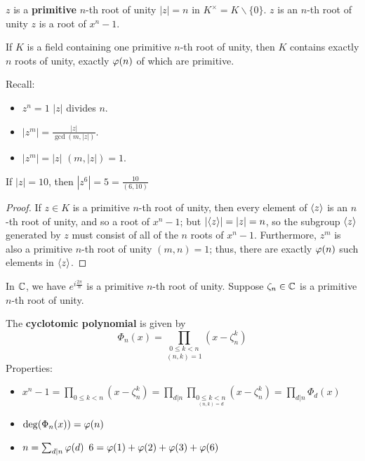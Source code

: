 \documentclass[12pt]{article}
\begin{document}
\rmk $z$ is a \textbf{primitive} $n$-th root of unity \ifnif $|z|=n$ in $K^{\times}=K\backslash \{0\}$.
\rmk $z$ is an $n$-th root of unity \ifnif $z$ is a root of $x^n-1$.

\begin{lemma}
    If $K$ is a field containing one primitive $n$-th root of unity, then $K$ contains exactly $n$ roots of unity, exactly $\varphi (n)$ of which are primitive.
\end{lemma}

\rmk Recall:
\begin{itemize}
    \item $z^n=1$ \ifnif $|z|$ divides $n$.
    \item $|z^m|=\frac{|z|}{\gcd(m,|z|)}$.
    \item $|z^m|=|z|$ \ifnif $(m,|z|)=1$.
\end{itemize}
\eg If $|z|=10$, then $|z^6|=5=\frac{10}{(6,10)}$
\begin{proof}
    If $z\in K$ is a primitive $n$-th root of unity, then every element of $\langle z \rangle$ is an $n$-th root of unity, and so a root of $x^n-1$; but $|\langle z \rangle|=|z|=n$, so the subgroup $\langle z \rangle$ generated by $z$  must consist of all of the $n$ roots of $x^n-1$. Furthermore, $z^m$ is also a primitive $n$-th root of unity \ifnif $(m,n)=1$; thus, there are exactly $\varphi (n)$ such elements in $\langle z \rangle$.
\end{proof}

In $\mathbb{C}$, we have $e^{i\frac{2\pi}{n}}$ is a primitive $n$-th root of unity. Suppose $\zeta_n\in \mathbb{C}$ is a primitive $n$-th root of unity.

 The \textbf{cyclotomic polynomial} is given by $$\Phi_n(x)=\underset{(n,k)=1}{\prod_{{0\leq k <n}}}(x-\zeta_n^k)$$
Properties: \begin{itemize}
    \item $x^n-1=\prod_{0\leq k <n}(x-\zeta_n^k)=\prod_{d|n}\prod_{\underset{(n,k)=d}{0\leq k<n}}(x-\zeta_n^k)=\prod_{d|n}\Phi_d(x)$
    \item $\deg(\Phi_n(x))=\varphi (n)$
    \item $n=\sum_{d|n}\varphi (d)$
    \eg $6=\varphi (1)+\varphi (2)+\varphi (3)+\varphi (6)$
\end{itemize}


\end{document}
